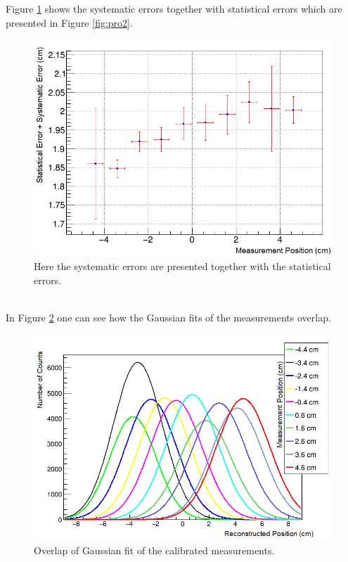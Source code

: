 \documentclass[a4paper]{article}\linespread{1.4}
\begin{document}
Figure \ref{fig:pro3} shows the systematic errors together with statistical errors which are presented in Figure \ref{fig:pro2}.
\begin{figure}[] \hspace*{-0cm} \includegraphics[width=120mm,scale=2.0]{pro3.png} \caption{Here the systematic errors are presented together with the statistical errors.} \label{fig:pro3}\end{figure}
\\In Figure \ref{fig:pro4} one can see how the Gaussian fits of the measurements overlap.
\begin{figure}[] \hspace*{-0cm} \includegraphics[width=130mm,scale=2.0]{pro4.png} \caption{Overlap of Gaussian fit of the calibrated measurements.}  \label{fig:pro4}\end{figure}
\end{document}
